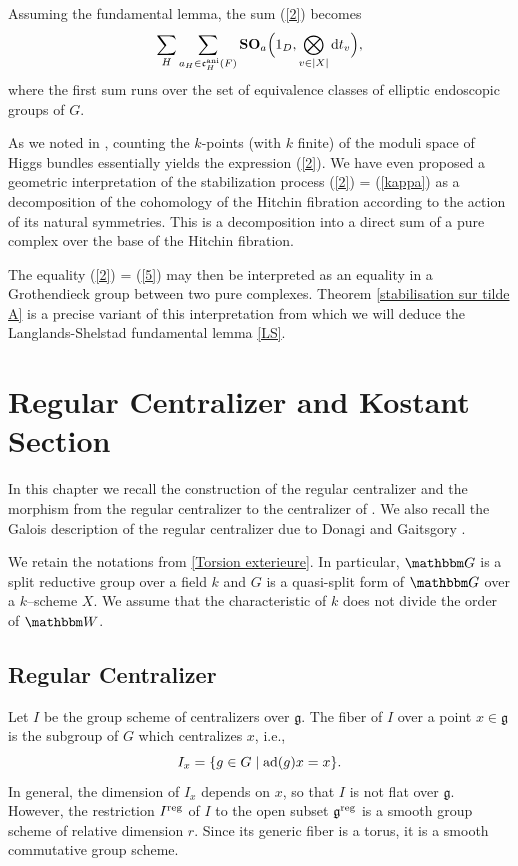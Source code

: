 \documentclass[12pt,english]{smfart}
\numberwithin{equation}{subsection}
\theoremstyle{remark}
\newcommand\frakc{{\mathfrak c}}
\newcommand\GG{{\mathbbm G}}
\newcommand\bbW{{\mathbbm W}}
\newcommand\ad{{\rm ad}}
\newcommand\reg{{\rm reg}}
\begin{document}
Assuming the fundamental lemma, the sum (\ref{2}) becomes
\begin{equation}\label{5}
\sum_{H} \sum_{a_H\in \frakc_H^{\rm ani}(F)} {\bf SO}_a\Bigl(1_D,\bigotimes_{v\in|X|}{\rm d}t_v\Bigr),
\end{equation}
where the first sum runs over the set of equivalence classes of elliptic endoscopic groups of $G$.

As we noted in \cite[1]{N}, counting the $k$-points (with $k$ finite) of the moduli space of Higgs bundles essentially yields the expression (\ref{2}). We have even proposed a geometric interpretation of the stabilization process (\ref{2}) = (\ref{kappa}) as a decomposition of the cohomology of the Hitchin fibration according to the action of its natural symmetries. This is a decomposition into a direct sum of a pure complex over the base of the Hitchin fibration.

The equality (\ref{2}) = (\ref{5}) may then be interpreted as an equality in a Grothendieck group between two pure complexes. Theorem \ref{stabilisation sur tilde A} is a precise variant of this interpretation from which we will deduce the Langlands-Shelstad fundamental lemma \ref{LS}.

\section{Regular Centralizer and Kostant Section}
\label{section : centralisateur regulier}

In this chapter we recall the construction of the regular centralizer and the morphism from the regular centralizer to the centralizer of \cite{N}. We also recall the Galois description of the regular centralizer due to Donagi and Gaitsgory \cite{DG}.

We retain the notations from \ref{Torsion exterieure}. In particular, $\GG$ is a split reductive group over a field $k$ and $G$ is a quasi-split form of $\GG$ over a $k$--scheme $X$. We assume that the characteristic of $k$ does not divide the order of $\bbW$.

\subsection{Regular Centralizer}\label{centralisateur regulier}

Let $I$ be the group scheme of centralizers over $\mathfrak{g}$. The fiber of $I$ over a point $x\in\mathfrak{g}$ is the subgroup of $G$ which centralizes $x$, i.e.,
$$
I_x=\{g\in G \mid \ad(g)x=x\}.
$$
In general, the dimension of $I_x$ depends on $x$, so that $I$ is not flat over $\mathfrak{g}$. However, the restriction $I^\reg$ of $I$ to the open subset $\mathfrak{g}^\reg$ is a smooth group scheme of relative dimension $r$. Since its generic fiber is a torus, it is a smooth commutative group scheme.
\end{document}
